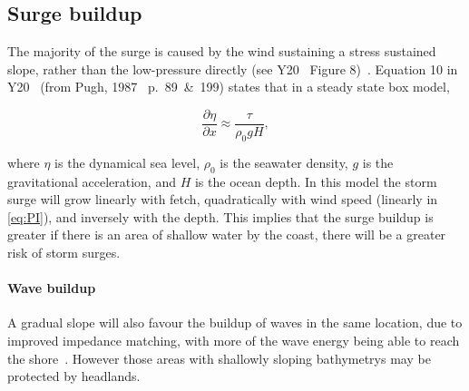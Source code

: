 \subsection{Surge buildup}

The majority of the surge is caused by the wind
sustaining a stress sustained slope,
rather than the low-pressure directly
(see Y20~\cite{ZannaPreprint} Figure 8)~\cite{emanuel2005divine}. Equation 10 in Y20~\cite{ZannaPreprint}
(from Pugh, 1987~\cite{pugh1987tides} p.~89~\&~199) states that in a steady state box model,

\begin{equation}
\frac{\partial \eta}{\partial x}
\approx \frac{\tau}{\rho_{0} g H},
\label{eq:pugh}
\end{equation}

where $\eta$ is the dynamical sea level, $\rho_0$ is the seawater density,
$g$ is the gravitational acceleration, and $H$ is the ocean depth.
In this model
the storm surge
will grow linearly with fetch,
quadratically with wind speed (linearly in \ref{eq:PI}),
and inversely with the depth.
This implies that the surge buildup is greater if there is an area of
shallow water by the coast, there will
be a greater risk of storm surges.


\paragraph{Wave buildup}

A gradual slope will also favour the buildup of waves in the same location, due to
improved impedance matching, with more of the wave energy being able to
reach the shore~\cite{pugh1987tides}. However those areas with shallowly sloping
bathymetrys may be protected by headlands.
